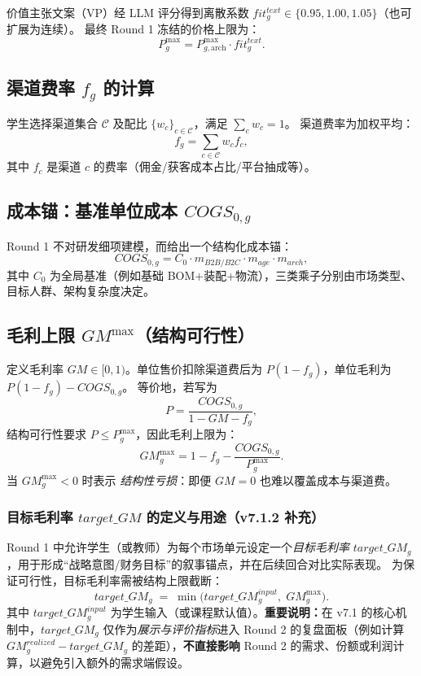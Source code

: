 \documentclass[UTF8,12pt]{ctexart}
\begin{document}
价值主张文案（VP）经 LLM 评分得到离散系数 $fit^{text}_g\in\{0.95,1.00,1.05\}$（也可扩展为连续）。
最终 Round 1 冻结的价格上限为：
\begin{equation}
P^{\max}_g = P^{\max}_{g,\mathrm{arch}}\cdot fit^{text}_g.
\label{eq:pmax_final}
\end{equation}

\subsection{渠道费率 $f_g$ 的计算}
学生选择渠道集合 $\mathcal{C}$ 及配比 $\{w_c\}_{c\in\mathcal{C}}$，满足 $\sum_c w_c=1$。
渠道费率为加权平均：
\begin{equation}
f_g=\sum_{c\in\mathcal{C}} w_c f_c,
\end{equation}
其中 $f_c$ 是渠道 $c$ 的费率（佣金/获客成本占比/平台抽成等）。

\subsection{成本锚：基准单位成本 $COGS_{0,g}$}
Round 1 不对研发细项建模，而给出一个结构化成本锚：
\begin{equation}
COGS_{0,g} = C_0 \cdot m_{B2B/B2C}\cdot m_{age}\cdot m_{arch},
\label{eq:cogs0}
\end{equation}
其中 $C_0$ 为全局基准（例如基础 BOM+装配+物流），三类乘子分别由市场类型、目标人群、架构复杂度决定。

\subsection{毛利上限 $GM^{\max}$（结构可行性）}
定义毛利率 $GM\in[0,1)$。单位售价扣除渠道费后为 $P(1-f_g)$，单位毛利为 $P(1-f_g)-COGS_{0,g}$。
等价地，若写为
\[
P=\frac{COGS_{0,g}}{1-GM-f_g},
\]
结构可行性要求 $P\le P^{\max}_g$，因此毛利上限为：
\begin{equation}
GM^{\max}_g = 1 - f_g - \frac{COGS_{0,g}}{P^{\max}_g}.
\label{eq:gmmax}
\end{equation}
当 $GM^{\max}_g<0$ 时表示 \emph{结构性亏损}：即便 $GM=0$ 也难以覆盖成本与渠道费。


\subsubsection{目标毛利率 \texorpdfstring{$target\_GM$}{target\_GM} 的定义与用途（v7.1.2 补充）}
Round 1 中允许学生（或教师）为每个市场单元设定一个\emph{目标毛利率} $target\_GM_g$，用于形成“战略意图/财务目标”的叙事锚点，并在后续回合对比实际表现。
为保证可行性，目标毛利率需被结构上限截断：
\begin{equation}
target\_GM_g \;=\; \min\big(target\_GM^{input}_g,\; GM^{\max}_g\big).
\label{eq:target_gm_def}
\end{equation}
其中 $target\_GM^{input}_g$ 为学生输入（或课程默认值）。\textbf{重要说明：}在 v7.1 的核心机制中，$target\_GM_g$ 仅作为\emph{展示与评价指标}进入 Round 2 的复盘面板（例如计算 $GM^{realized}_g-target\_GM_g$ 的差距），\textbf{不直接影响} Round 2 的需求、份额或利润计算，以避免引入额外的需求端假设。
\end{document}
